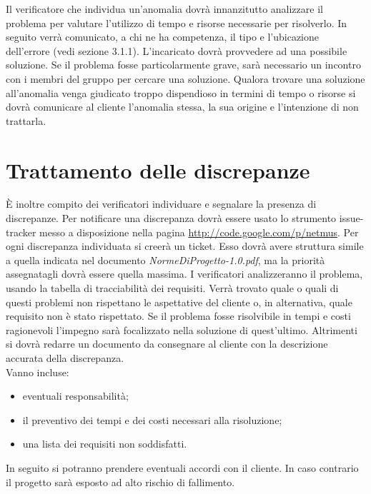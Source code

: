 Il verificatore che individua un'anomalia dovr\`a innanzitutto analizzare il
problema per valutare l'utilizzo di tempo e risorse necessarie per risolverlo.
In seguito verr\`a comunicato, a chi ne ha competenza, il tipo e l'ubicazione dell'errore (vedi sezione 3.1.1).
L'incaricato dovr\`a provvedere ad una possibile soluzione. Se il problema
fosse particolarmente grave, sar\`a necessario un incontro con i membri del gruppo
per cercare una soluzione. Qualora trovare una soluzione all'anomalia venga giudicato troppo dispendioso in termini di tempo o risorse si dovr\`a comunicare
al cliente l'anomalia stessa, la sua origine e l'intenzione di non trattarla.

\section{Trattamento delle discrepanze}

\`E inoltre compito dei verificatori individuare e segnalare la presenza di
discrepanze. Per notificare una discrepanza dovr\`a essere usato lo strumento
issue-tracker messo a disposizione nella pagina \url{http://code.google.com/p/netmus}. Per ogni discrepanza
individuata si creer\`a un ticket. Esso dovr\`a avere struttura simile a quella indicata nel
documento \emph{NormeDiProgetto-1.0.pdf}, ma la priorit\`a assegnatagli dovr\`a essere quella
massima. I verificatori analizzeranno il problema, usando la tabella di
tracciabilit\`a dei requisiti. Verr\`a trovato quale o quali di questi problemi non
rispettano le aspettative del cliente o, in alternativa, quale requisito non \`e
stato rispettato. Se il problema fosse risolvibile in tempi e costi ragionevoli
l'impegno sar\`a focalizzato nella soluzione di quest'ultimo. Altrimenti si dovr\`a
redarre un documento da consegnare al cliente con la descrizione accurata della
discrepanza.\\

Vanno incluse:

\begin{itemize}

\item eventuali responsabilit\`a;
\item il preventivo dei tempi e dei costi necessari alla risoluzione;
\item una lista dei requisiti non soddisfatti.

\end{itemize}

In seguito si potranno prendere eventuali accordi con il cliente. In caso
contrario il progetto sar\`a esposto ad alto rischio di fallimento.

